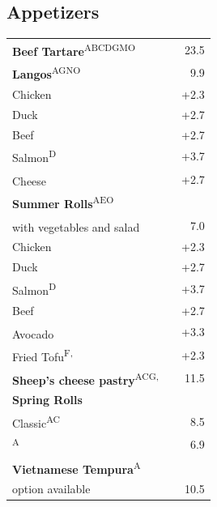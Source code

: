 \documentclass[a4paper,12pt]{article}
\newcommand{\vegan}{\textbf{\scriptsize \color{vegan}{Vegan}}}
\newcommand{\vegetarisch}{\textbf{\scriptsize \color{vegan}{Veg}}}
\begin{document}
\begin{multicols}{2}
\section*{Appetizers}
\begin{tabular}{Lrr}
\textbf{Beef Tartare}\textsuperscript{{\scriptsize ABCDGMO}} & & 23.5\vspace{0.1cm}\\
\textbf{Langos}\textsuperscript{{\scriptsize AGNO}} & & 9.9\\
\hspace{0.4cm}Chicken & & +2.3\\
\hspace{0.4cm}Duck & & +2.7\\
\hspace{0.4cm}Beef & & +2.7\\
\hspace{0.4cm}Salmon\textsuperscript{{\scriptsize D}} & & +3.7\\
\hspace{0.4cm}Cheese\textsuperscript{\vegetarisch} & & +2.7\vspace{0.1cm}\\
\textbf{Summer Rolls}\textsuperscript{{\scriptsize AEO}}\\
\hspace{0.4cm}with vegetables and salad\textsuperscript{{\scriptsize \vegan}} & & 7.0\\
\hspace{0.4cm}Chicken & & +2.3\\
\hspace{0.4cm}Duck & & +2.7\\
\hspace{0.4cm}Salmon\textsuperscript{{\scriptsize D}} & & +3.7\\
\hspace{0.4cm}Beef & & +2.7\\
\hspace{0.4cm}Avocado\textsuperscript{{\scriptsize \vegan}} & & +3.3\\
\hspace{0.4cm}Fried Tofu\textsuperscript{{\scriptsize F, \vegan}} & & +2.3\vspace{0.1cm}\\
\textbf{Sheep's cheese pastry}\textsuperscript{{\scriptsize ACG, \vegetarisch}} & & 11.5\vspace{0.1cm}\\
\textbf{Spring Rolls}\\
\hspace{0.4cm}Classic\textsuperscript{{\scriptsize AC}} & & 8.5\\
\textsuperscript{{\scriptsize A}} & & 6.9\vspace{0.1cm}\\
\textbf{Vietnamese Tempura}\textsuperscript{{\scriptsize A}}\\
\hspace{0.4cm}\scriptsize {} option available & & 10.5
\end{tabular}


\end{multicols}
\end{document}
